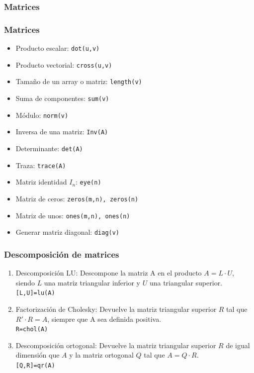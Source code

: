 \subsubsection{Matrices}
\begin{frame}[label=array_funciones,shrink=10]
 \frametitle{Matrices}
 \begin{itemize}
  \item Producto escalar: \texttt{dot(u,v)}
  \item Producto vectorial: \texttt{cross(u,v)}
  \item Tamaño de un array o matriz: \texttt{length(v)}
  \item Suma de componentes: \texttt{sum(v)}
  \item Módulo: \texttt{norm(v)}
  \item Inversa de una matriz: \texttt{Inv(A)}
  \item Determinante: \texttt{det(A)}
  \item Traza: \texttt{trace(A)}
  \item Matriz identidad $I_n$: \alert{\texttt{eye(n)}}
  \item Matriz de ceros: \texttt{zeros(m,n), zeros(n)}
  \item Matriz de unos: \texttt{ones(m,n), ones(n)}
  \item Generar matriz diagonal: \texttt{diag(v)}
 \end{itemize}
\end{frame}
\begin{frame}[label=func_builtin2,shrink=5]
 \frametitle{Descomposición de matrices}
 \begin{enumerate}
   \item Descomposición \alert{LU}: Descompone la matriz A en el producto
      $A=L\cdot U$, siendo $L$ una matriz triangular inferior y $U$ una
      triangular superior.
      \\\hspace{1cm}\texttt{[L,U]=lu(A)}
   \item Factorización de \alert{Cholesky}: Devuelve la matriz triangular
      superior $R$ tal que $R'\cdot R=A$, siempre que A sea definida positiva.
      \\\hspace{1cm}\texttt{R=chol(A)}
   \item Descomposición \alert{ortogonal}: Devuelve la matriz triangular
      superior $R$ de igual dimensión que $A$ y la matriz ortogonal $Q$ tal que
      $A=Q\cdot R$.
      \\\hspace{1cm}\texttt{[Q,R]=qr(A)}
 \end{enumerate}
\end{frame}
